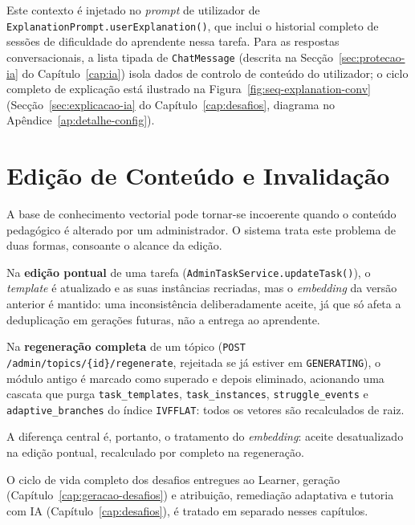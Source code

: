 Este contexto é injetado no \textit{prompt} de utilizador de \texttt{ExplanationPrompt.userExplanation()}, que inclui o historial completo de sessões de dificuldade do aprendente nessa tarefa.
Para as respostas conversacionais, a lista tipada de \texttt{ChatMessage} (descrita na Secção~\ref{sec:protecao-ia} do Capítulo~\ref{cap:ia}) isola dados de controlo de conteúdo do utilizador; o ciclo completo de explicação está ilustrado na Figura~\ref{fig:seq-explanation-conv} (Secção~\ref{sec:explicacao-ia} do Capítulo~\ref{cap:desafios}, diagrama no Apêndice~\ref{ap:detalhe-config}).

\section{Edição de Conteúdo e Invalidação} \label{sec:invalidacao}

A base de conhecimento vectorial pode tornar-se incoerente quando o conteúdo pedagógico é alterado por um administrador.
O sistema trata este problema de duas formas, consoante o alcance da edição.

Na \textbf{edição pontual} de uma tarefa (\texttt{AdminTaskService.updateTask()}), o \textit{template} é atualizado e as suas instâncias recriadas, mas o \textit{embedding} da versão anterior é mantido: uma inconsistência deliberadamente aceite, já que só afeta a deduplicação em gerações futuras, não a entrega ao aprendente.

Na \textbf{regeneração completa} de um tópico (\texttt{POST /admin/topics/\{id\}/regenerate}, rejeitada se já estiver em \texttt{GENERATING}), o módulo antigo é marcado como superado e depois eliminado, acionando uma cascata que purga \texttt{task\_templates}, \texttt{task\_instances}, \texttt{struggle\_events} e \texttt{adaptive\_branches} do índice \texttt{IVFFLAT}: todos os vetores são recalculados de raiz.

A diferença central é, portanto, o tratamento do \textit{embedding}: aceite desatualizado na edição pontual, recalculado por completo na regeneração.

O ciclo de vida completo dos desafios entregues ao Learner, geração (Capítulo~\ref{cap:geracao-desafios}) e atribuição, remediação adaptativa e tutoria com IA (Capítulo~\ref{cap:desafios}), é tratado em separado nesses capítulos.
